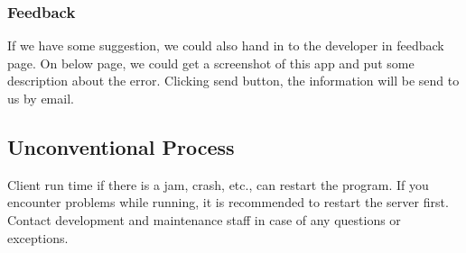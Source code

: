 \documentclass[10pt]{article}
\begin{document}
\subsubsection{Feedback}
If we have some suggestion, we could also hand in to the developer in feedback page. On below page, we could get a screenshot of this app and put some description about the error. Clicking send button, the information will be send to us by email.

\begin{figure}[H]
	\centering

\end{figure}

\subsection{Unconventional Process}
Client run time if there is a jam, crash, etc., can restart the program. If you encounter problems while running, it is recommended to restart the server first. Contact development and maintenance staff in case of any questions or exceptions.
\end{document}
